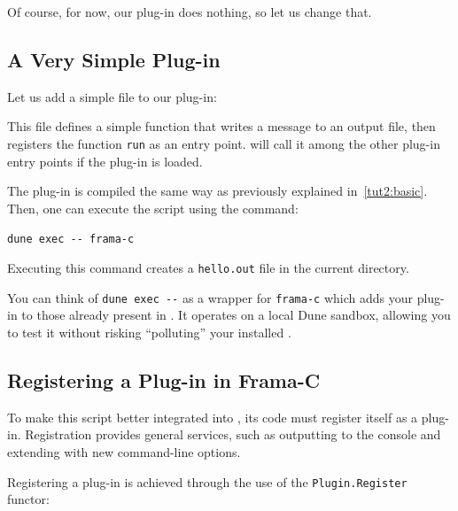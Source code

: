 Of course, for now, our plug-in does nothing, so let us change that.

\subsection{A Very Simple Plug-in}\label{tut2:simple}

Let us add a simple file to our plug-in:


This file defines a simple function that writes a message to an output file,
then registers the function \texttt{run} as an entry point. \framac will call
it among the other plug-in entry points if the plug-in is loaded.

The plug-in is compiled the same way as previously explained in~\ref{tut2:basic}.
Then, one can execute the script using the command:

\lstinline{dune exec -- frama-c}

Executing this command creates a \texttt{hello.out} file in the current
directory.

\begin{important}
  You can think of \verb+dune exec --+ as a wrapper for \texttt{frama-c}
  which adds your plug-in to those already present in \framac.
  It operates on a local Dune sandbox, allowing you to test it without
  risking ``polluting'' your installed \framac.
\end{important}

\subsection{Registering a Plug-in in Frama-C}\label{tut2:plugin}

To make this script better integrated into \framac, its code must register
itself as a plug-in. Registration provides general services, such as
outputting to the \framac console and extending \framac with new command-line
options.

Registering a plug-in is achieved through the use of the
\texttt{Plugin.Register} functor:


